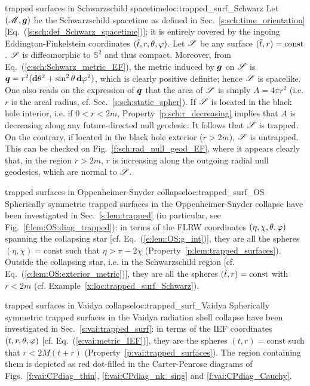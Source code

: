 \begin{texample}{trapped surfaces in Schwarzschild spacetime}{loc:trapped_surf_Schwarz}
Let $(\mathscr{M},\bm{g})$ be the Schwarzschild spacetime as defined in Sec.~\ref{s:sch:time_orientation} [Eq.~(\ref{s:sch:def_Schwarz_spacetime})]; it is entirely covered by the ingoing Eddington-Finkelstein coordinates
$({\tilde t},r,\theta,\varphi)$. Let $\mathscr{S}$ be any surface $({\tilde t},r) = \mathrm{const}$.
$\mathscr{S}$ is diffeomorphic to $\mathbb{S}^2$ and thus compact.
Moreover, from Eq.~(\ref{e:sch:Schwarz_metric_EF}), the metric induced by $\bm{g}$
on $\mathscr{S}$ is $\bm{q} = r^2 (\mathbf{d}\theta^2 + \sin^2\theta\,\mathbf{d}\varphi^2)$, which is clearly positive definite;
hence $\mathscr{S}$ is spacelike. One also reads on the expression of $\bm{q}$
that the area of  $\mathscr{S}$ is simply $A = 4\pi r^2$ (i.e. $r$ is the areal radius, cf. Sec.~\ref{s:sch:static_spher}).
If $\mathscr{S}$ is located in the black hole interior, i.e. if $0<r < 2m$,
Property~\ref{p:sch:r_decreasing} implies that $A$ is decreasing along any future-directed null
geodesic. It follows that $\mathscr{S}$ is trapped. On the contrary, if located in the black hole exterior
($r> 2m$), $\mathscr{S}$ is untrapped. This can be checked on Fig.~\ref{f:sch:rad_null_geod_EF},
where it appears clearly that, in the region $r>2m$, $r$ is increasing along the outgoing radial null geodesics, which are normal to $\mathscr{S}$.
\end{texample}

\begin{texample}{trapped surfaces in Oppenheimer-Snyder collapse}{loc:trapped_surf_OS}
Spherically symmetric trapped surfaces in the Oppenheimer-Snyder collapse
have been investigated in Sec.~\ref{s:lem:trapped} (in particular, see Fig.~\ref{f:lem:OS:diag_trapped}): in terms of the FLRW coordinates $(\eta,\chi,\theta,\varphi)$
spanning the collapsing star
[cf. Eq.~(\ref{e:lem:OS:g_int})], they are all the spheres $(\eta,\chi) = \mathrm{const}$
such that $\eta > \pi - 2 \chi$ (Property~\ref{p:lem:trapped_surfaces}). Outside
the collapsing star, i.e. in the Schwarzschild region [cf. Eq.~(\ref{e:lem:OS:exterior_metric})], they are all the spheres
$({\tilde t},r) = \mathrm{const}$ with $r< 2m$ (cf. Example~\ref{x:loc:trapped_surf_Schwarz}).
\end{texample}

\begin{texample}{trapped surfaces in Vaidya collapse}{loc:trapped_surf_Vaidya}
Spherically symmetric trapped surfaces in the Vaidya radiation shell collapse
have been investigated in Sec.~\ref{s:vai:trapped_surf}: in terms of the
IEF coordinates $(t,r,\theta,\varphi)$ [cf. Eq.~(\ref{e:vai:metric_IEF})],
they are the spheres $(t,r) = \mathrm{const}$
such that $r < 2M(t+r)$ (Property~\ref{p:vai:trapped_surfaces}).
The region containing them is depicted as red dot-filled
in the Carter-Penrose diagrams of Figs.~\ref{f:vai:CPdiag_thin}, \ref{f:vai:CPdiag_nk_sing}
and \ref{f:vai:CPdiag_Cauchy}.
\end{texample}


